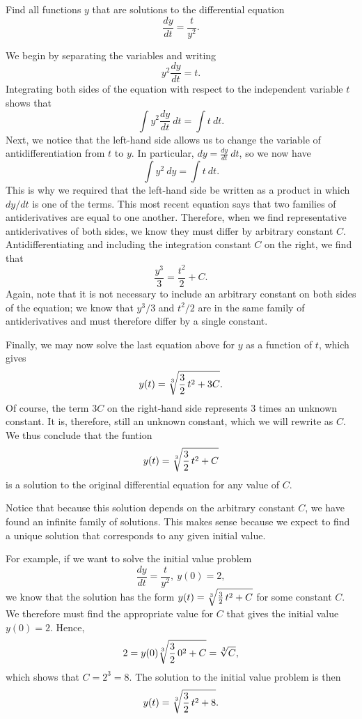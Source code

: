 
\begin{example} \label{eg:6.7.1} %
Find all functions $y$ that are solutions to the differential equation 
$$\frac{dy}{dt}= \frac{t}{y^2}.$$

\solution We begin by separating the variables and writing
$$ y^2\frac{dy}{dt} = t. $$
Integrating both sides of the equation with respect to the independent variable $t$ shows that
$$ \int y^2\frac{dy}{dt}~dt = \int t~dt. $$
Next, we notice that the left-hand side allows us to change the variable of antidifferentiation from $t$ to $y$.  In particular, $dy = \frac{dy}{dt}~dt$, so we now have
$$ \int y^2 ~dy = \int t~dt. $$
This is why we required that the left-hand side be written as a product in which $dy/dt$ is one of the terms. This most recent equation says that two families of antiderivatives are equal to one another.  Therefore, when we find representative antiderivatives of both sides, we know they must differ by arbitrary constant $C$.  Antidifferentiating and including the integration constant $C$ on the right, we find that
$$ \frac{y^3}{3} = \frac{t^2}{2} + C. $$
    Again, note that it is not necessary to include an arbitrary constant on both sides 
    of the equation;  we know that $y^3/3$ and $t^2/2$ are in the same
    family of antiderivatives and must therefore differ by a single
    constant.

Finally, we may now solve the last equation above for $y$ as a function of $t$, which gives
    $$
    y(t) = \sqrt[3]{\frac 32 \thinspace t^2 + 3C}.
    $$
    Of course, the term $3C$ on the right-hand side represents
    $3$ times an unknown constant.  It is, therefore, still an unknown
    constant, which we will rewrite as $C$.  We thus conclude that the funtion
    $$
    y(t) = \sqrt[3]{\frac 32 \thinspace t^2 + C}
    $$
is a solution to the original differential equation for any value of $C$.

Notice that because this solution depends on the arbitrary constant $C$, we have found an infinite family of
solutions.  This makes sense because we expect to find a unique solution that corresponds to any given
 initial value.

For example, if we want to solve the initial value problem
$$
  \frac{dy}{dt} = \frac{t}{y^2}, \
  y(0) = 2,
$$
we know that the solution has the form $y(t) = \sqrt[3]{\frac32\thinspace
  t^2 + C}$ for some constant $C$.  We therefore must find the appropriate
value for $C$ that gives the initial value $y(0)=2$.  Hence,
$$
  2 = y(0)  \sqrt[3]{\frac 32 \thinspace 0^2 + C} = \sqrt[3]{C},
  $$
which shows that $C = 2^3 = 8$.  The solution to the initial value problem is then
$$
y(t) = \sqrt[3]{\frac32\thinspace t^2+8}.
$$
\end{example}